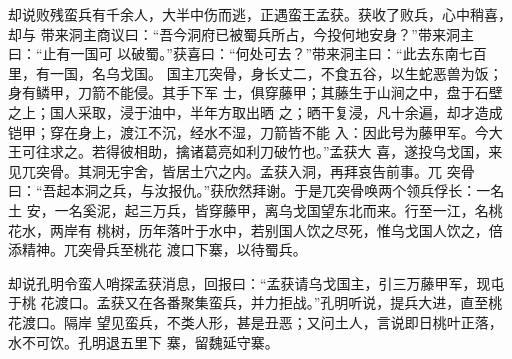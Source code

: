却说败残蛮兵有千余人，大半中伤而逃，正遇蛮王孟获。获收了败兵，心中稍喜，却与
带来洞主商议曰：“吾今洞府已被蜀兵所占，今投何地安身？”带来洞主曰：“止有一国可
以破蜀。”获喜曰：“何处可去？”带来洞主曰：“此去东南七百里，有一国，名乌戈国。
国主兀突骨，身长丈二，不食五谷，以生蛇恶兽为饭；身有鳞甲，刀箭不能侵。其手下军
士，俱穿藤甲；其藤生于山涧之中，盘于石壁之上；国人采取，浸于油中，半年方取出晒
之；晒干复浸，凡十余遍，却才造成铠甲；穿在身上，渡江不沉，经水不湿，刀箭皆不能
入：因此号为藤甲军。今大王可往求之。若得彼相助，擒诸葛亮如利刀破竹也。”孟获大
喜，遂投乌戈国，来见兀突骨。其洞无宇舍，皆居土穴之内。孟获入洞，再拜哀告前事。兀
突骨曰：“吾起本洞之兵，与汝报仇。”获欣然拜谢。于是兀突骨唤两个领兵俘长：一名土
安，一名奚泥，起三万兵，皆穿藤甲，离乌戈国望东北而来。行至一江，名桃花水，两岸有
桃树，历年落叶于水中，若别国人饮之尽死，惟乌戈国人饮之，倍添精神。兀突骨兵至桃花
渡口下寨，以待蜀兵。

却说孔明令蛮人哨探孟获消息，回报曰：“孟获请乌戈国主，引三万藤甲军，现屯于桃
花渡口。孟获又在各番聚集蛮兵，并力拒战。”孔明听说，提兵大进，直至桃花渡口。隔岸
望见蛮兵，不类人形，甚是丑恶；又问土人，言说即日桃叶正落，水不可饮。孔明退五里下
寨，留魏延守寨。

